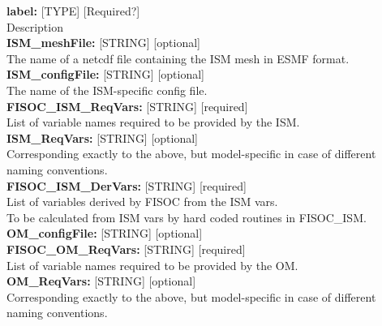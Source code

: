 \documentclass[12pt]{article}
\begin{document}
\begin{flushleft}
\textbf{label:}             [TYPE]   [Required?]                          \\
Description                                                               \\
\vspace{6pt}
\vspace{6pt}
\textbf{ISM\_meshFile:}      [STRING] [optional]                          \\
The name of a netcdf file containing the ISM mesh in ESMF format.         \\
\vspace{6pt}
\textbf{ISM\_configFile:}    [STRING] [optional]                          \\
The name of the ISM-specific config file.                                 \\
\vspace{6pt}
\textbf{FISOC\_ISM\_ReqVars:} [STRING] [required]                         \\
List of variable names required to be provided by the ISM.                \\
\vspace{6pt}
\textbf{ISM\_ReqVars:}       [STRING] [optional]                          \\
Corresponding exactly to the above, but model-specific in case of different naming conventions. \\
\vspace{6pt}
\textbf{FISOC\_ISM\_DerVars:} [STRING] [required]                         \\
List of variables derived by FISOC from the ISM vars.                     \\ 
To be calculated from ISM vars by hard coded routines in FISOC\_ISM.      \\
\vspace{6pt}
\textbf{OM\_configFile:}     [STRING] [optional]                          \\
\vspace{6pt}
\textbf{FISOC\_OM\_ReqVars:}  [STRING] [required]                         \\
List of variable names required to be provided by the OM.                 \\
\vspace{6pt}
\textbf{OM\_ReqVars:}        [STRING] [optional]                          \\
Corresponding exactly to the above, but model-specific in case of different naming conventions. \\

\end{flushleft}
\end{document}
